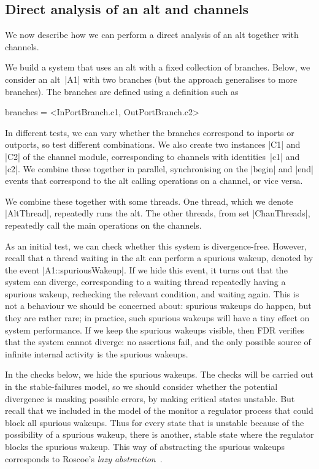 \subsection{Direct analysis of an alt and channels}
\label{sec:combined}

\inlineCSP

We now describe how we can perform a direct analysis of an alt together with
channels.  

We build a system that uses an alt with a fixed collection of branches.
Below, we consider an alt~|A1| with two branches (but the approach generalises
to more branches).  The branches are defined using a definition such as
%
\begin{cspm}
branches =  <InPortBranch.c1, OutPortBranch.c2>
\end{cspm}
%
In different tests, we can vary whether the branches correspond to inports or
outports, so test different combinations.  We also create two instances |C1|
and |C2| of the channel module, corresponding to channels with
identities~|c1| and |c2|.  We combine these together in parallel,
synchronising on the |begin| and |end| events that correspond to the alt
calling operations on a channel, or vice versa.

We combine these together with some threads.  One thread, which we denote
|AltThread|, repeatedly runs the alt.  The other threads, from set
|ChanThreads|, repeatedly call the main operations on the channels.

As an initial test, we can check whether this system is divergence-free.
However, recall that a thread waiting in the alt can perform a spurious
wakeup, denoted by the event |A1::spuriousWakeup|.  If we hide this event, it
turns out that the system can diverge, corresponding to a waiting thread
repeatedly having a spurious wakeup, rechecking the relevant condition, and
waiting again.  This is not a behaviour we should be concerned about: spurious
wakeups do happen, but they are rather rare; in practice, such spurious
wakeups will have a tiny effect on system performance.  If we keep the
spurious wakeups visible, then FDR verifies that the system cannot diverge: no
assertions fail, and the only possible source of infinite internal activity is
the spurious wakeups.

In the checks below, we hide the spurious wakeups.  The checks will be carried
out in the stable-failures model, so we should consider whether the potential
divergence is masking possible errors, by making critical states unstable.
But recall that we included in the model of the monitor a regulator process
that could block all spurious wakeups.  Thus for every state that is unstable
because of the possibility of a spurious wakeup, there is another, stable
state where the regulator blocks the spurious wakeup.  This way of abstracting
the spurious wakeups corresponds to Roscoe's \emph{lazy
  abstraction}~\cite{awr:UCS}. 

